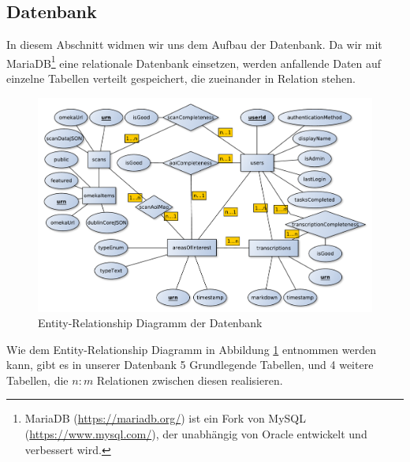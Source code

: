 \documentclass{article}
\begin{document}
\subsection{Datenbank}
In diesem Abschnitt widmen wir uns dem Aufbau der Datenbank.
Da wir mit MariaDB\footnote{
    MariaDB (\url{https://mariadb.org/}) ist ein Fork von MySQL (\url{https://www.mysql.com/}), der unabhängig von Oracle entwickelt und verbessert wird.
    }
eine relationale Datenbank einsetzen,
werden anfallende Daten auf einzelne Tabellen verteilt gespeichert,
die zueinander in Relation stehen.

\begin{figure}[H]
\includegraphics[width=\textwidth]{../notes/ER.pdf}
\caption{Entity-Relationship Diagramm der Datenbank}
\label{fig:er}
\end{figure}

Wie dem Entity-Relationship Diagramm in Abbildung \ref{fig:er} entnommen werden kann,
gibt es in unserer Datenbank 5 Grundlegende Tabellen,
und 4 weitere Tabellen,
die $n:m$ Relationen zwischen diesen realisieren.
\end{document}

